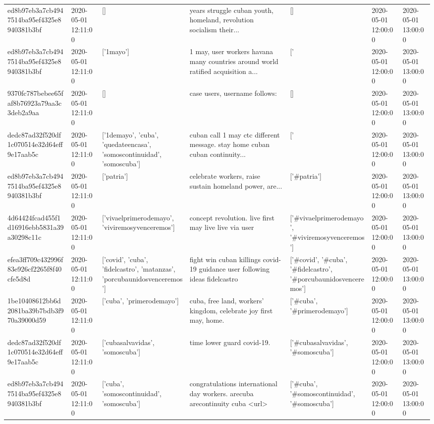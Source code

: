 \begin{tabular}{lllllll}
ed8b97eb3a7cb4947514ba95ef4325e8940381b3bf & 2020-05-01 12:11:00 & [] & years struggle cuban youth, homeland, revolution socialism their... & [] & 2020-05-01 12:00:00 & 2020-05-01 13:00:00 \\
ed8b97eb3a7cb4947514ba95ef4325e8940381b3bf & 2020-05-01 12:11:00 & ['1mayo'] & 1 may, user workers havana many countries around world ratified acquisition a... & ['#1mayo'] & 2020-05-01 12:00:00 & 2020-05-01 13:00:00 \\
9370fc787bebee65faf8b76923a79aa3c3deb2a9aa & 2020-05-01 12:11:00 & [] & case users, username follows: & [] & 2020-05-01 12:00:00 & 2020-05-01 13:00:00 \\
dedc87ad32f520df1c070514e32d64eff9e17aab5c & 2020-05-01 12:11:00 & ['1demayo', 'cuba', 'quedateencasa', 'somoscontinuidad', 'somoscuba'] & cuban call 1 may ctc different message. stay home cuban cuban continuity... & ['#1demayo', '#cuba', '#quedateencasa', '#somoscontinuidad', '#somoscuba'] & 2020-05-01 12:00:00 & 2020-05-01 13:00:00 \\
ed8b97eb3a7cb4947514ba95ef4325e8940381b3bf & 2020-05-01 12:11:00 & ['patria'] & celebrate workers, raise sustain homeland power, are... & ['#patria'] & 2020-05-01 12:00:00 & 2020-05-01 13:00:00 \\
4d64424fcad455f1d16916ebb5831a39a30298c11c & 2020-05-01 12:11:00 & ['vivaelprimerodemayo', 'viviremosyvenceremos'] & concept revolution. live first may live live via user & ['#vivaelprimerodemayo', '#viviremosyvenceremos'] & 2020-05-01 12:00:00 & 2020-05-01 13:00:00 \\
efea3ff709c432996f83e926cf2265f8f40cfe5d8d & 2020-05-01 12:11:00 & ['covid', 'cuba', 'fidelcastro', 'matanzas', 'porcubaunidosvenceremos'] & fight win cuban killings covid-19 guidance user following ideas fidelcastro & ['#covid', '#cuba', '#fidelcastro', '#porcubaunidosvenceremos'] & 2020-05-01 12:00:00 & 2020-05-01 13:00:00 \\
1be10408612bb6d2081ba39b7bdb3f970a39000d59 & 2020-05-01 12:11:00 & ['cuba', 'primerodemayo'] & cuba, free land, workers' kingdom, celebrate joy first may, home. & ['#cuba', '#primerodemayo'] & 2020-05-01 12:00:00 & 2020-05-01 13:00:00 \\
dedc87ad32f520df1c070514e32d64eff9e17aab5c & 2020-05-01 12:11:00 & ['cubasalvavidas', 'somoscuba'] & time lower guard covid-19. & ['#cubasalvavidas', '#somoscuba'] & 2020-05-01 12:00:00 & 2020-05-01 13:00:00 \\
ed8b97eb3a7cb4947514ba95ef4325e8940381b3bf & 2020-05-01 12:11:00 & ['cuba', 'somoscontinuidad', 'somoscuba'] & congratulations international day workers. arecuba arecontinuity cuba <url> & ['#cuba', '#somoscontinuidad', '#somoscuba'] & 2020-05-01 12:00:00 & 2020-05-01 13:00:00 \\

\end{tabular}
